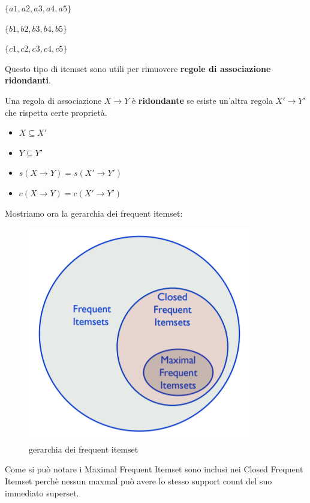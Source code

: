 $\{a1,a2,a3,a4,a5\}$

$\{b1,b2,b3,b4,b5\}$

$\{c1,c2,c3,c4,c5\}$


Questo tipo di itemset sono utili per rimuovere \textbf{regole di associazione ridondanti}. 
\begin{defn}
	Una regola di associazione $X \rightarrow Y$ \`e \textbf{ridondante} se esiste un'altra regola $X' \rightarrow Y'$ che rispetta certe propriet\`a. 
	\begin{itemize}
		\item $X \subseteq X'$
		\item $Y \subseteq Y'$
		\item $s(X \rightarrow Y)  = s(X' \rightarrow Y')$
		\item $c(X \rightarrow Y)  = c(X' \rightarrow Y')$
	\end{itemize}
\end{defn}

Mostriamo ora la gerarchia dei frequent itemset:
\begin{figure}[H]
	\centering
	\includegraphics[height=0.45 \linewidth]{association/pict/itemset_freq.png}
	\caption{gerarchia dei frequent itemset}
\end{figure}

Come si può notare i Maximal Frequent Itemset sono inclusi nei Closed Frequent Itemset perchè nessun maxmal può avere lo stesso support count del suo immediato superset.

